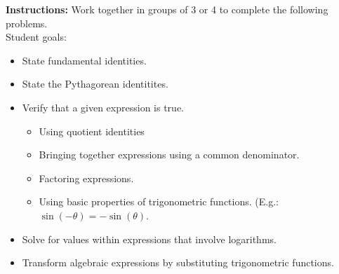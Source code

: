 


\noindent \textbf{Instructions:}  Work together in groups of  3 or 4
to complete the following problems.\\

Student goals:
\begin{itemize}
\item State fundamental identities.
\item State the Pythagorean identitites.
\item Verify that a given expression is true.
  \begin{itemize}
  \item Using quotient identities
  \item Bringing together expressions using a common denominator.
  \item Factoring expressions.
  \item Using basic properties of trigonometric functions. (E.g.:
    $\sin(-\theta)=-\sin(\theta)$.
  \end{itemize}
\item Solve for values within expressions that involve logarithms.
\item Transform algebraic expressions by substituting trigonometric
  functions.
\end{itemize}

\vfill

